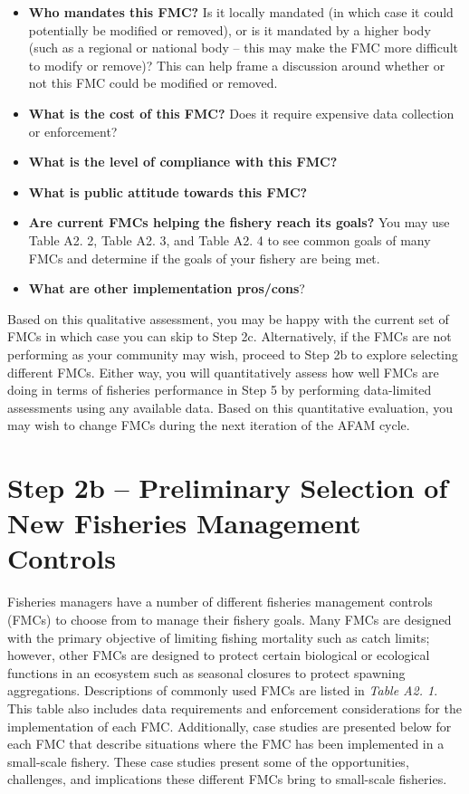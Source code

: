 \documentclass[]{book}
\begin{document}
\begin{itemize}
\item
  \textbf{Who mandates this FMC?} Is it locally mandated (in which case
  it could potentially be modified or removed), or is it mandated by a
  higher body (such as a regional or national body -- this may make the
  FMC more difficult to modify or remove)? This can help frame a
  discussion around whether or not this FMC could be modified or
  removed.
\item
  \textbf{What is the cost of this FMC?} Does it require expensive data
  collection or enforcement?
\item
  \textbf{What is the level of compliance with this FMC?}
\item
  \textbf{What is public attitude towards this FMC?}
\item
  \textbf{Are current FMCs helping the fishery reach its goals?} You may
  use Table A2. 2, Table A2. 3, and Table A2. 4 to see common goals of
  many FMCs and determine if the goals of your fishery are being met.
\item
  \textbf{What are other implementation pros/cons}?
\end{itemize}

Based on this qualitative assessment, you may be happy with the current
set of FMCs in which case you can skip to Step 2c. Alternatively, if the
FMCs are not performing as your community may wish, proceed to Step 2b
to explore selecting different FMCs. Either way, you will quantitatively
assess how well FMCs are doing in terms of fisheries performance in Step
5 by performing data-limited assessments using any available data. Based
on this quantitative evaluation, you may wish to change FMCs during the
next iteration of the AFAM cycle.

\section{Step 2b -- Preliminary Selection of New Fisheries Management
Controls}\label{step-2b-preliminary-selection-of-new-fisheries-management-controls}

Fisheries managers have a number of different fisheries management
controls (FMCs) to choose from to manage their fishery goals. Many FMCs
are designed with the primary objective of limiting fishing mortality
such as catch limits; however, other FMCs are designed to protect
certain biological or ecological functions in an ecosystem such as
seasonal closures to protect spawning aggregations. Descriptions of
commonly used FMCs are listed in \emph{Table A2. 1}. This table also
includes data requirements and enforcement considerations for the
implementation of each FMC. Additionally, case studies are presented
below for each FMC that describe situations where the FMC has been
implemented in a small-scale fishery. These case studies present some of
the opportunities, challenges, and implications these different FMCs
bring to small-scale fisheries.
\end{document}
